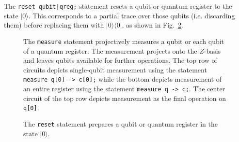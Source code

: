 \documentclass[USenglish,12pt,fleqn]{article} %
\newcommand*{\code}{\texttt}
\begin{document}
The \code{reset qubit|qreg;} statement resets a qubit or quantum register to the state $|0\rangle$. This corresponds to a partial trace over those qubits (i.e. discarding them) before replacing them with $|0\rangle\langle 0|$, as shown in Fig.~\ref{fig:prepare}.

\begin{figure}
\begin{minipage}{.3\textwidth}
\centering
\end{minipage}
\begin{minipage}{.3\textwidth}
\centering
\end{minipage}
\begin{minipage}{.3\textwidth}
\centering
\end{minipage}

\begin{minipage}{.3\textwidth}
\centering
\end{minipage}
\begin{minipage}{.3\textwidth}
\centering
\end{minipage}
\begin{minipage}{.3\textwidth}
\centering
\end{minipage}
\caption{The \code{measure} statement projectively measures a qubit or each qubit of a quantum register. The measurement projects onto the $Z$-basis and leaves qubits available for further operations. The top row of circuits depicts single-qubit measurement using the statement \code{measure q[0] -> c[0];} while the bottom depicts measurement of an entire register using the statement \code{measure q -> c;}. The center circuit of the top row depicts measurement as the final operation on \code{q[0]}.
\label{fig:measure}}
\end{figure}

\begin{figure}
\begin{minipage}{.3\textwidth}
\centering

\end{minipage}
\begin{minipage}{.3\textwidth}
\centering
\end{minipage}
\begin{minipage}{.3\textwidth}
\centering
\end{minipage}
\caption{The \code{reset} statement prepares a qubit or quantum register in the state $|0\rangle$.
\label{fig:prepare}}
\end{figure}
\end{document}
